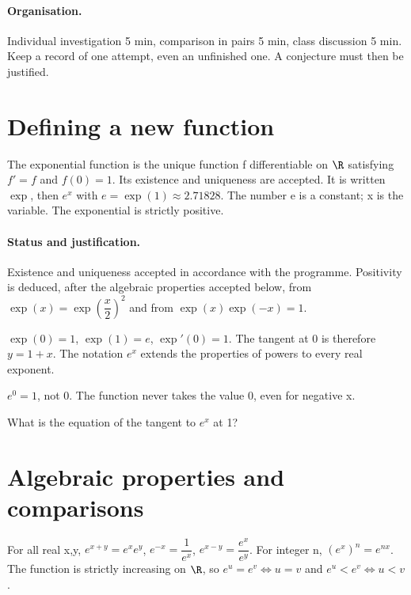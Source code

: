 \paragraph{Organisation.} Individual investigation 5 min, comparison in pairs 5 min, class discussion 5 min. Keep a record of one attempt, even an unfinished one. A conjecture must then be justified.
\mxnewpage
\section{Defining a new function}\label{C09-U1}
\begin{keypoint}
The exponential function is the unique function f differentiable on $\R$ satisfying $f\prime=f$ and $f(0)=1$. Its existence and uniqueness are accepted. It is written $\exp$, then $e^x$ with $e=\exp(1)\approx\num{2,71828}$. The number e is a constant; x is the variable. The exponential is strictly positive.
\end{keypoint}
\paragraph{Status and justification.} Existence and uniqueness accepted in accordance with the programme. Positivity is deduced, after the algebraic properties accepted below, from $\exp (x)=\exp (\dfrac{x}{2})^2$ and from $\exp(x)\exp(-x)=1$.
\begin{example}$\exp(0)=1$, $\exp(1)=e$, $\exp\prime(0)=1$. The tangent at 0 is therefore $y=1+x$. The notation $e^x$ extends the properties of powers to every real exponent.\end{example}\label{C09-EX1}
\begin{pitfall}$e^0=1$, not 0. The function never takes the value 0, even for negative x.\end{pitfall}
\begin{application}What is the equation of the tangent to $e^x$ at 1?\end{application}\label{C09-AP1}
\section{Algebraic properties and comparisons}\label{C09-U2}
\begin{keypoint}
For all real x,y, $e^{x+y}=e^xe^y$, $e^{-x}=\dfrac{1}{e^x}$, $e^{x-y}=\dfrac{e^x}{e^y}$. For integer n, $(e^x)^n=e^{nx}$. The function is strictly increasing on $\R$, so $e^u=e^v\iff u=v$ and $e^u<e^v\iff u<v$.
\end{keypoint}
